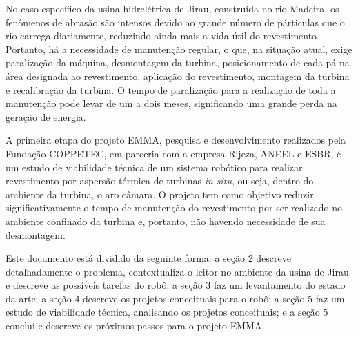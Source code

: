 No caso específico da usina hidrelétrica de Jirau, construída no rio Madeira,
os fenômenos de abrasão são intensos devido ao grande número
de párticulas que o rio carrega diariamente, reduzindo ainda mais a vida útil do revestimento.
Portanto, há a necessidade de manutenção regular, o que, na situação atual,
exige paralização da máquina, desmontagem da turbina, posicionamento de cada pá
na área designada ao revestimento, aplicação do revestimento, montagem da
turbina e recalibração da turbina. O tempo de paralização para a realização de
toda a manutenção pode levar de um a dois meses, significando uma grande perda
na geração de energia. 

A primeira etapa do projeto EMMA, pesquisa e desenvolvimento
realizados pela Fundação COPPETEC, em parceria com a empresa Rijeza, ANEEL e
ESBR, é um estudo de viabilidade técnica de um sistema robótico para realizar
revestimento por aspersão térmica de turbinas \textit{in situ}, ou seja, dentro
do ambiente da turbina, o aro câmara. O projeto tem como objetivo reduzir
significativamente o tempo de manutenção do revestimento por ser realizado no
ambiente confinado da turbina e, portanto, não havendo necessidade de sua
desmontagem.

Este documento está dividido da seguinte forma: a seção 2 descreve
detalhadamente o problema, contextualiza o leitor no ambiente da usina de
Jirau e descreve as possíveis tarefas do robô; a seção 3 faz um levantamento do
estado da arte; a seção 4 descreve os projetos conceituais para o robô; a seção
5 faz um estudo de viabilidade técnica, analisando os projetos conceituais; e a
seção 5 conclui e descreve os próximos passos para o projeto EMMA. 
